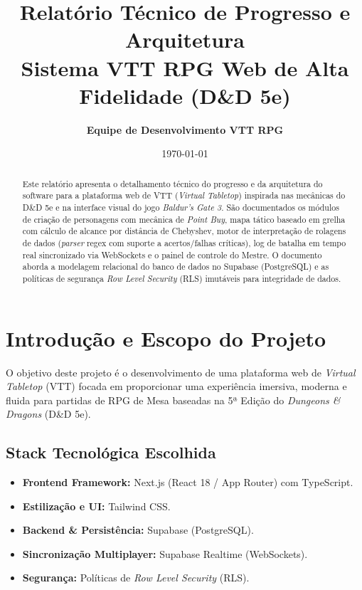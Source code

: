 \documentclass[12pt,a4paper]{article}
\title{\textbf{Relatório Técnico de Progresso e Arquitetura}\\ Sistema VTT RPG Web de Alta Fidelidade (D\&D 5e)}
\author{\textbf{Equipe de Desenvolvimento VTT RPG}}
\date{\today}
\begin{document}
\maketitle

\begin{abstract}
Este relatório apresenta o detalhamento técnico do progresso e da arquitetura do software para a plataforma web de VTT (\textit{Virtual Tabletop}) inspirada nas mecânicas do D\&D 5e e na interface visual do jogo \textit{Baldur's Gate 3}. São documentados os módulos de criação de personagens com mecânica de \textit{Point Buy}, mapa tático baseado em grelha com cálculo de alcance por distância de Chebyshev, motor de interpretação de rolagens de dados (\textit{parser} regex com suporte a acertos/falhas críticas), log de batalha em tempo real sincronizado via WebSockets e o painel de controle do Mestre. O documento aborda a modelagem relacional do banco de dados no Supabase (PostgreSQL) e as políticas de segurança \textit{Row Level Security} (RLS) imutáveis para integridade de dados.
\end{abstract}

\tableofcontents
\newpage

\section{Introdução e Escopo do Projeto}
O objetivo deste projeto é o desenvolvimento de uma plataforma web de \textit{Virtual Tabletop} (VTT) focada em proporcionar uma experiência imersiva, moderna e fluida para partidas de RPG de Mesa baseadas na 5ª Edição do \textit{Dungeons \& Dragons} (D\&D 5e).

\subsection{Stack Tecnológica Escolhida}
\begin{itemize}
    \item \textbf{Frontend Framework:} Next.js (React 18 / App Router) com TypeScript.
    \item \textbf{Estilização e UI:} Tailwind CSS.
    \item \textbf{Backend \& Persistência:} Supabase (PostgreSQL).
    \item \textbf{Sincronização Multiplayer:} Supabase Realtime (WebSockets).
    \item \textbf{Segurança:} Políticas de \textit{Row Level Security} (RLS).
\end{itemize}
\end{document}
